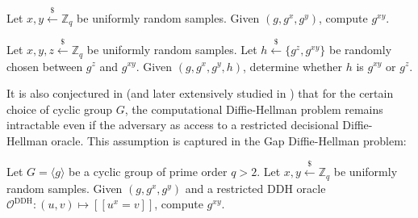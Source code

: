 \documentclass[runningheads]{llncs}
\newcommand{\leftsample}{\stackrel{\$}{\leftarrow}}
\newcommand{\llbrack}{[\![}
\newcommand{\rrbrack}{]\!]}
\begin{document}
\begin{definition}
    Let $x, y \leftsample \mathbb{Z}_q$ be uniformly random samples. Given $(g, g^x, g^y)$, compute $g^{xy}$.
\end{definition}
\begin{definition}
    Let $x, y, z \leftsample \mathbb{Z}_q$ be uniformly random samples. Let $h \leftsample \{g^z, g^{xy}\}$ be randomly chosen between $g^z$ and $g^{xy}$. Given $(g, g^x, g^y, h)$, determine whether $h$ is $g^{xy}$ or $g^z$. 
\end{definition}

It is also conjectured in \cite{DBLP:conf/ctrsa/AbdallaBR01} (and later extensively studied in \cite{DBLP:conf/pkc/OkamotoP01}) that for the certain choice of cyclic group $G$, the computational Diffie-Hellman problem remains intractable even if the adversary as access to a restricted decisional Diffie-Hellman oracle. This assumption is captured in the Gap Diffie-Hellman problem:

\begin{definition}
    Let $G = \langle g \rangle$ be a cyclic group of prime order $q > 2$. Let $x, y \leftsample \mathbb{Z}_q$ be uniformly random samples. Given $(g, g^x, g^y)$ and a restricted DDH oracle $\mathcal{O}^\text{DDH}: (u, v) \mapsto \llbrack u^x = v \rrbrack$, compute $g^{xy}$.
\end{definition}
\end{document}
